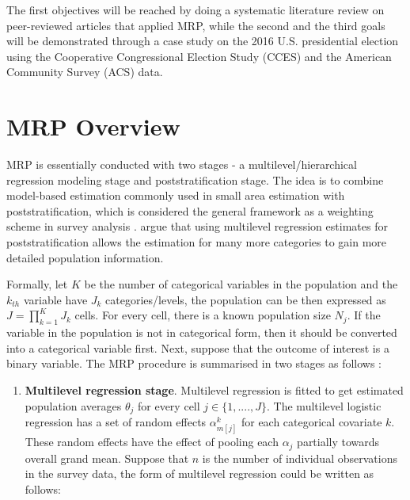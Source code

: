 \documentclass{monashthesis}
\begin{document}
The first objectives will be reached by doing a systematic literature review on peer-reviewed articles that applied MRP, while the second and the third goals will be demonstrated through a case study on the 2016 U.S. presidential election using the Cooperative Congressional Election Study (CCES) and the American Community Survey (ACS) data.

\hypertarget{overview}{%
\section{MRP Overview}\label{overview}}

MRP is essentially conducted with two stages - a multilevel/hierarchical regression modeling stage and poststratification stage. The idea is to combine model-based estimation commonly used in small area estimation with poststratification, which is considered the general framework as a weighting scheme in survey analysis \autocite{Gelman97poststratificationinto}. \textcite{Gelman97poststratificationinto} argue that using multilevel regression estimates for poststratification allows the estimation for many more categories to gain more detailed population information.

Formally, let \(K\) be the number of categorical variables in the population and the \(k_{th}\) variable have \(J_k\) categories/levels, the population can be then expressed as \(J = \prod_{k=1}^K J_k\) cells. For every cell, there is a known population size \(N_j\). If the variable in the population is not in categorical form, then it should be converted into a categorical variable first. Next, suppose that the outcome of interest is a binary variable. The MRP procedure is summarised in two stages as follows \autocite{GaoYuxiang2021IMRa}:

\begin{enumerate}
\def\labelenumi{\arabic{enumi}.}
\tightlist
\item
  \textbf{Multilevel regression stage}. Multilevel regression is fitted to get estimated population averages \(\theta_j\) for every cell \(j \in \{1, ...., J\}\). The multilevel logistic regression has a set of random effects \(\alpha^k_{m[j]}\) for each categorical covariate \(k\). These random effects have the effect of pooling each \(\alpha_j\) partially towards overall grand mean. Suppose that \(n\) is the number of individual observations in the survey data, the form of multilevel regression could be written as follows:
\end{enumerate}
\end{document}
